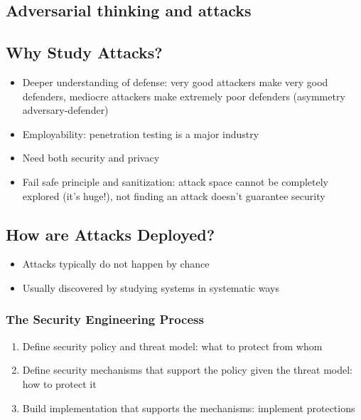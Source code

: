 \documentclass{article}
\newenvironment{myitemize}
{ \begin{itemize}
    \setlength{\itemsep}{005pt}
    \setlength{\parskip}{0pt}
    \setlength{\parsep}{0pt}     }
{ \end{itemize}                  }
\begin{document}
\begin{multicols}{2}

\section{Adversarial thinking and attacks}

\subsection{Why Study Attacks?}

\begin{myitemize}
    \item Deeper understanding of defense: very good attackers make very good defenders, mediocre attackers make extremely poor defenders (asymmetry adversary-defender)
    \item Employability: penetration testing is a major industry
    \item Need both security and privacy
    \item Fail safe principle and sanitization: attack space cannot be completely explored (it's huge!), not finding an attack doesn't guarantee security
\end{myitemize}


\subsection{How are Attacks Deployed?}

\begin{myitemize}
    \item Attacks typically do not happen by chance
    \item Usually discovered by studying systems in systematic ways
\end{myitemize}

\subsubsection{The Security Engineering Process}

\begin{enumerate}
    \item Define security policy and threat model: what to protect from whom
    \item Define security mechanisms that support the policy given the threat model: how to protect it
    \item Build implementation that supports the mechanisms: implement protections
\end{enumerate}


\end{multicols}
\end{document}
